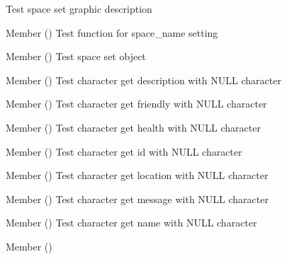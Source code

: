 \begin{DoxyRefList}
%
Test space set graphic description  
\item[Member \doxylink{space__test_8c_a2569bab6cfeec15f722d232bb8c78c9e}{test1\+\_\+space\+\_\+set\+\_\+name} ()]\label{test__test000116}%
%
Test function for space\+\_\+name setting  
\item[Member \doxylink{space__test_8c_a208ae9352ff979024f6ebef4e791356a}{test1\+\_\+space\+\_\+set\+\_\+object} ()]\label{test__test000119}%
%
Test space set object  
\item[Member \doxylink{character__test_8c_a774b69706adb4d56e65b9bd82afc4e8e}{test2\+\_\+character\+\_\+get\+\_\+description} ()]\label{test__test000015}%
%
Test character get description with NULL character  
\item[Member \doxylink{character__test_8c_a86a876aee28d07e4f303bc58c5a64f51}{test2\+\_\+character\+\_\+get\+\_\+friendly} ()]\label{test__test000025}%
%
Test character get friendly with NULL character  
\item[Member \doxylink{character__test_8c_a73548b592b58d36e2c9579512396444c}{test2\+\_\+character\+\_\+get\+\_\+health} ()]\label{test__test000019}%
%
Test character get health with NULL character  
\item[Member \doxylink{character__test_8c_acc183175913712e7f2b0e98a9b55bc2b}{test2\+\_\+character\+\_\+get\+\_\+id} ()]\label{test__test000003}%
%
Test character get id with NULL character  
\item[Member \doxylink{character__test_8c_ad834bab186e918d7439109f084e1b05c}{test2\+\_\+character\+\_\+get\+\_\+location} ()]\label{test__test000007}%
%
Test character get location with NULL character  
\item[Member \doxylink{character__test_8c_a085a8c64daee7cb3a5bc38a9017717ba}{test2\+\_\+character\+\_\+get\+\_\+message} ()]\label{test__test000029}%
%
Test character get message with NULL character  
\item[Member \doxylink{character__test_8c_a01ef678eee58465bbdc52094838a65f7}{test2\+\_\+character\+\_\+get\+\_\+name} ()]\label{test__test000011}%
%
Test character get name with NULL character  
\item[Member \doxylink{character__test_8c_ab70ae5a0718f19c8566df6fb0694a004}{test2\+\_\+character\+\_\+print} ()]\label{test__test000033}%

\end{DoxyRefList}
